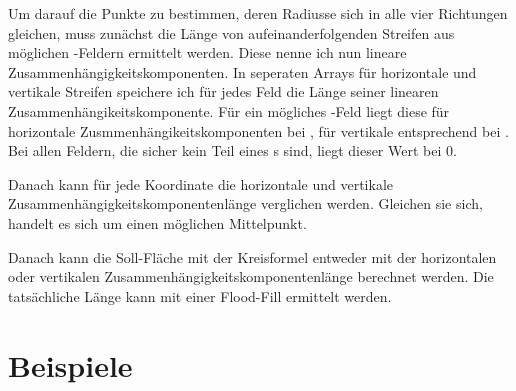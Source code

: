 Um darauf die Punkte zu bestimmen, deren Radiusse sich in alle vier Richtungen gleichen, muss zunächst die Länge von aufeinanderfolgenden Streifen aus möglichen \task{}-Feldern ermittelt werden. Diese nenne ich nun lineare Zusammenhängigkeitskomponenten. In seperaten Arrays für horizontale und vertikale Streifen speichere ich für jedes Feld die Länge seiner linearen Zusammenhängikeitskomponente. Für ein mögliches \task{}-Feld liegt diese für horizontale Zusmmenhängikeitskomponenten bei
, für vertikale entsprechend bei
. Bei allen Feldern, die sicher kein Teil eines \task{}s sind, liegt dieser Wert bei 0. 

Danach kann für jede Koordinate die horizontale und vertikale Zusammenhängigkeitskomponentenlänge verglichen werden. Gleichen sie sich, handelt es sich um einen möglichen Mittelpunkt.

Danach kann die Soll-Fläche mit der Kreisformel entweder mit der horizontalen oder vertikalen Zusammenhängigkeitskomponentenlänge berechnet werden. Die tatsächliche Länge kann mit einer Flood-Fill ermittelt werden.

\section{Beispiele}
